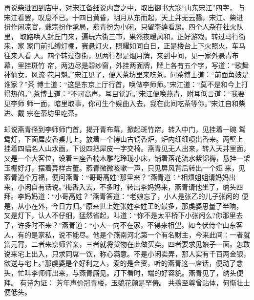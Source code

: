 再说柴进回到店中，对宋江备细说内宫之中，取出御书大寇“山东宋江”四字，
与宋江看罢，叹息不已。十四日黄昏，明月从东而起，天上并无云翳，宋江、柴进
扮作闲凉官，戴宗扮作承局，燕青扮为小闲，只留李逵看房。四个人杂在社火队里，
取路哄入封丘门来，遍玩六街三市，果然夜暖风和，正好游戏。转过马行街来，家
家门前扎缚灯棚，赛悬灯火，照耀如同白日，正是楼台上下火照火，车马往来人看
人。四个转过御街，见两行都是烟月牌，来到中间，见一家外悬青布幕，里挂斑竹
帘，两边尽是碧纱窗，外挂两面牌，牌上各有五个字，写道：“歌舞神仙女，风流
花月魁。”宋江见了，便入茶坊里来吃茶，问茶博士道：“前面角妓是谁家？”茶
博士道：“这是东京上厅行首，唤做李师师。”宋江道：“莫不是和今上打得热的。”
茶博士道：“不可高声，耳目觉近。”宋江便唤燕青，附耳低言道：“我要见李师
师一面，暗里取事，你可生个婉曲入去，我在此间吃茶等你。”宋江自和柴进、戴
宗在茶坊里吃茶。

却说燕青径到李师师门首，揭开青布幕，掀起斑竹帘，转入中门，见挂着一碗
鸳鸯灯，下面犀皮香桌儿上，放着一个博山古铜香炉，炉内细细喷出香来。两壁上
挂着四幅名人山水画，下设四把犀皮一字交椅。燕青见无人出来，转入天井里面，
又是一个大客位，设着三座香楠木雕花玲珑小床，铺着落花流水紫锦褥，悬挂一架
玉棚好灯，摆着异样古董。燕青微微咳嗽一声，只见屏风背后转出一个娅来，见
燕青道个万福，便问燕青：“哥哥高姓?那里来？”燕青道：“相烦姐姐请妈妈出
来，小闲自有话说。”梅香入去，不多时，转出李妈妈来，燕青请他坐了，纳头四
拜。李妈妈道：“小哥高姓？”燕青答道：“老娘忘了，小人是张乙的儿子张闲的
便是，从小在外，今日方归。”原来世上姓张姓李姓王的最多，那虔婆思量了半晌，
又是灯下，认人不仔细，猛然省起，叫道：“你不是太平桥下小张闲么?你那里去
了，许多时不来？”燕青道：“小人一向不在家，不得来相望。如今伏侍个山东客
人，有的是家私，说不能尽。他是个燕南河北第一个有名财主，今来此间：一者就
赏元宵，二者来京师省亲，三者就将货物在此做买卖，四者要求见娘子一面。怎敢
说来宅上出入，只求同席一饮，称心满意。不是小闲卖弄，那人实有千百两金银，
欲送与宅上。”那虔婆是个好利之人，爱的是金资，听的燕青这一席话，便动了念
头，忙叫李师师出来，与燕青厮见。灯下看时，端的好容貌。燕青见了，纳头便拜。
有诗为证：
芳年声价冠青楼，玉貌花颜是罕俦。
共羡至尊曾贴体，何惭壮士便低头。

